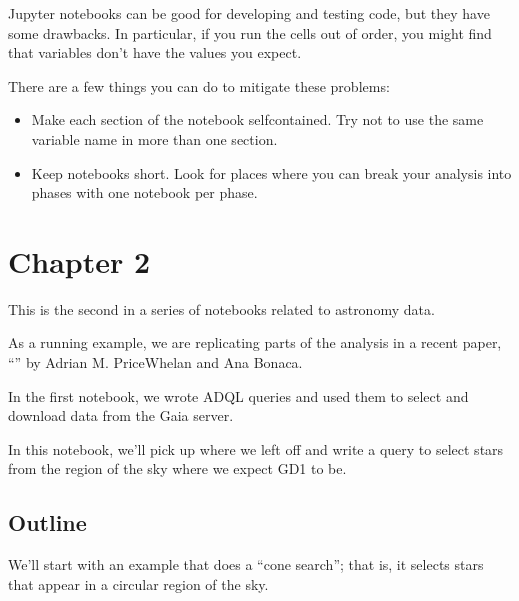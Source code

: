 \documentclass[letterpaper,10pt,english]{sphinxmanual}
\begin{document}
Jupyter notebooks can be good for developing and testing code, but they have some drawbacks.  In particular, if you run the cells out of order, you might find that variables don’t have the values you expect.

There are a few things you can do to mitigate these problems:
\begin{itemize}
\item {} 
Make each section of the notebook self\sphinxhyphen{}contained.  Try not to use the same variable name in more than one section.

\item {} 
Keep notebooks short.  Look for places where you can break your analysis into phases with one notebook per phase.

\end{itemize}


\chapter{Chapter 2}
\label{\detokenize{02_coords:chapter-2}}\label{\detokenize{02_coords::doc}}
This is the second in a series of notebooks related to astronomy data.

As a running example, we are replicating parts of the analysis in a recent paper, “” by Adrian M. Price\sphinxhyphen{}Whelan and Ana Bonaca.

In the first notebook, we wrote ADQL queries and used them to select and download data from the Gaia server.

In this notebook, we’ll pick up where we left off and write a query to select stars from the region of the sky where we expect GD\sphinxhyphen{}1 to be.


\section{Outline}
\label{\detokenize{02_coords:outline}}
We’ll start with an example that does a “cone search”; that is, it selects stars that appear in a circular region of the sky.
\end{document}
